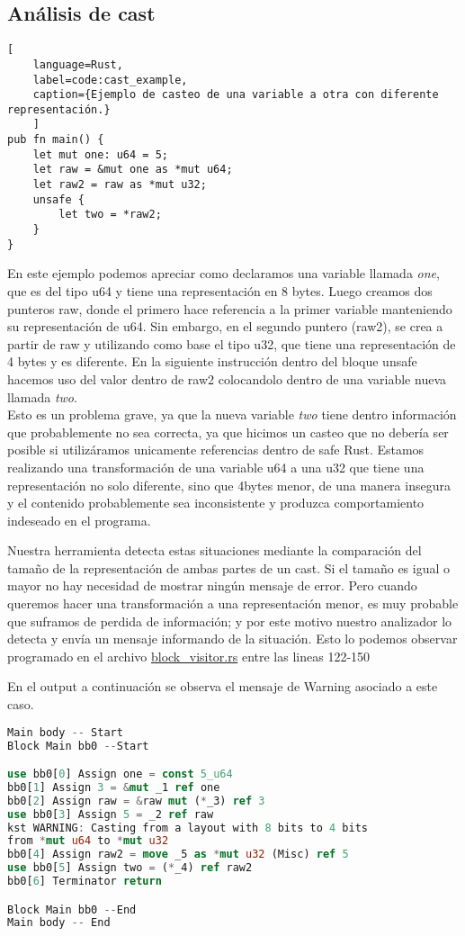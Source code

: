 \subsection{Análisis de cast}

\begin{lstlisting}[
    language=Rust,
    label=code:cast_example,
    caption={Ejemplo de casteo de una variable a otra con diferente representación.}
    ]
pub fn main() {
    let mut one: u64 = 5;
    let raw = &mut one as *mut u64;
    let raw2 = raw as *mut u32;
    unsafe {
        let two = *raw2;
    }
}
\end{lstlisting}

En este ejemplo podemos apreciar como declaramos una variable llamada \textit{one}, que es del tipo u64 y tiene una representación en 8 bytes.
Luego creamos dos punteros raw, donde el primero hace referencia a la primer variable manteniendo su representación de u64. Sin embargo,
en el segundo puntero (raw2), se crea a partir de raw y utilizando como base el tipo u32, que tiene una representación de 4 bytes y es diferente.
En la siguiente instrucción dentro del bloque unsafe hacemos uso del valor dentro de raw2 colocandolo dentro de una variable nueva llamada \textit{two}.\\
Esto es un problema grave, ya que la nueva variable \textit{two} tiene dentro información que probablemente no sea correcta, ya que hicimos un casteo
que no debería ser posible si utilizáramos unicamente referencias dentro de safe Rust. Estamos realizando una transformación de una variable u64
a una u32 que tiene una representación no solo diferente, sino que 4bytes menor, de una manera insegura y el contenido probablemente sea inconsistente
y produzca comportamiento indeseado en el programa.

Nuestra herramienta detecta estas situaciones mediante la comparación del tamaño de la representación de ambas partes de un cast. Si el tamaño es igual
o mayor no hay necesidad de mostrar ningún mensaje de error. Pero cuando queremos hacer una transformación a una representación menor, es muy probable
que suframos de perdida de información; y por este motivo nuestro analizador lo detecta y envía un mensaje informando de la situación. Esto lo podemos
observar programado en el archivo \href{run:../src/mir_visitor/block_visitor.rs}{block\_visitor.rs} entre las lineas 122-150

En el output a continuación se observa el mensaje de Warning asociado a este caso.

\begin{lstlisting}[language=rust]
Main body -- Start
Block Main bb0 --Start

use bb0[0] Assign one = const 5_u64
bb0[1] Assign 3 = &mut _1 ref one
bb0[2] Assign raw = &raw mut (*_3) ref 3
use bb0[3] Assign 5 = _2 ref raw
kst WARNING: Casting from a layout with 8 bits to 4 bits
from *mut u64 to *mut u32
bb0[4] Assign raw2 = move _5 as *mut u32 (Misc) ref 5
use bb0[5] Assign two = (*_4) ref raw2
bb0[6] Terminator return

Block Main bb0 --End
Main body -- End
\end{lstlisting}

